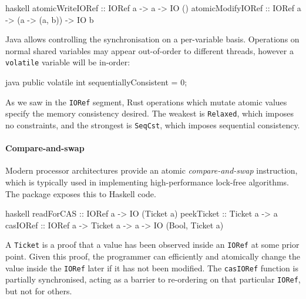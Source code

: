 \begin{listing}
\centering
\begin{cminted}{haskell}
atomicWriteIORef  :: IORef a -> a -> IO ()
atomicModifyIORef :: IORef a -> (a -> (a, b)) -> IO b
\end{cminted}
\caption{Atomic operations in Haskell.}\label{lst:atomic_haskell}
\end{listing}

Java allows controlling the synchronisation on a per-variable basis.
Operations on normal shared variables may appear out-of-order to
different threads, however a \verb|volatile| variable will be
in-order:

\begin{listing}
\centering
\begin{cminted}{java}
public volatile int sequentiallyConsistent = 0;
\end{cminted}
\caption{Atomic operations in Java.}\label{lst:atomic_java}
\end{listing}

As we saw in the \verb|IORef| segment, Rust operations which mutate
atomic values specify the memory consistency desired.  The weakest is
\verb|Relaxed|, which imposes no constraints, and the strongest is
\verb|SeqCst|, which imposes sequential consistency.

\paragraph{Compare-and-swap}
Modern processor architectures provide an atomic
\emph{compare-and-swap} instruction, which is typically used in
implementing high-performance lock-free algorithms.  The
 package exposes this to Haskell code.

\begin{listing}
\centering
\begin{cminted}{haskell}
readForCAS :: IORef a -> IO (Ticket a)
peekTicket :: Ticket a -> a
casIORef   :: IORef a -> Ticket a -> a -> IO (Bool, Ticket a)
\end{cminted}
\caption{Compare-and-swap in Haskell}\label{lst:cas_haskell}
\end{listing}

A \verb|Ticket| is a proof that a value has been observed inside an
\verb|IORef| at some prior point.  Given this proof, the programmer
can efficiently and atomically change the value inside the
\verb|IORef| later if it has not been modified.  The \verb|casIORef|
function is partially synchronised, acting as a barrier to re-ordering
on that particular \verb|IORef|, but not for others.

